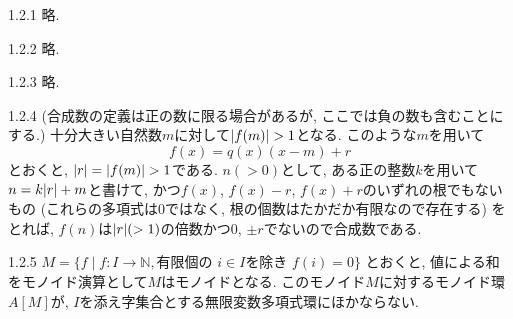\begin{ans}{1.2.1}
  略.
\end{ans}

\begin{ans}{1.2.2}
  略.
\end{ans}

\begin{ans}{1.2.3}
  略.
\end{ans}

\begin{ans}{1.2.4}
  (合成数の定義は正の数に限る場合があるが, ここでは負の数も含むことにする.)
  十分大きい自然数$m$に対して$\lvert f(m)\rvert > 1$となる. このような$m$を用いて
  \[
    f(x) = q(x)(x - m) + r
  \]
  とおくと, $\lvert r\rvert = \lvert f(m)\rvert > 1$である.
  $n (> 0)$として, ある正の整数$k$を用いて$n = k\lvert r\rvert + m$と書けて, かつ$f(x)$, $f(x)-r$, $f(x)+r$のいずれの根でもないもの (これらの多項式は$0$ではなく, 根の個数はたかだか有限なので存在する) をとれば,
  $f(n)$は$\lvert r\rvert (> 1)$の倍数かつ$0$, $\pm r$でないので合成数である.
\end{ans}

\begin{ans}{1.2.5}
  $M = \{ f \mid f: I \rightarrow \mathbb{N}, \text{有限個の } i \in I \text{を除き } f(i) = 0 \}$
  とおくと, 値による和をモノイド演算として$M$はモノイドとなる.
  このモノイド$M$に対するモノイド環$A[M]$が, $I$を添え字集合とする無限変数多項式環にほかならない.
\end{ans}
